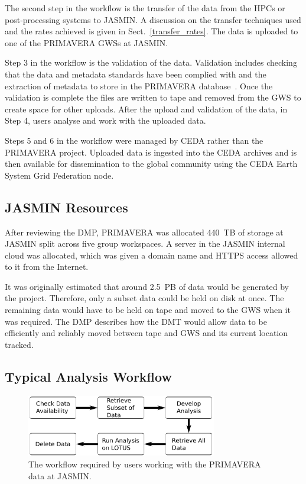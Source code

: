 \documentclass[gmd, manuscript]{copernicus}
\begin{document}
The second step in the workflow is the transfer of the data from the HPCs or post-processing systems to JASMIN. A discussion on the transfer techniques used and the rates achieved is given in Sect.~\ref{transfer_rates}. The data is uploaded to one of the PRIMAVERA GWSs at JASMIN.

Step 3 in the workflow is the validation of the data. Validation includes checking that the data and metadata standards have been complied with and the extraction of metadata to store in the PRIMAVERA database~\citep{Seddon2020}. Once the validation is complete the files are written to tape and removed from the GWS to create space for other uploads. After the upload and validation of the data, in Step 4, users analyse and work with the uploaded data. 

Steps 5 and 6 in the workflow were managed by CEDA rather than the PRIMAVERA project. Uploaded data is ingested into the CEDA archives and is then available for dissemination to the global community using the CEDA Earth System Grid Federation node.


\subsection{JASMIN Resources}

After reviewing the DMP, PRIMAVERA was allocated 440~TB of storage at JASMIN split across  five group workspaces. A server in the JASMIN internal cloud was allocated, which was given a domain name and  HTTPS access allowed to it from the Internet.

It was originally estimated that around 2.5~PB of data would be generated by the project. Therefore, only a subset data could be held on disk at once. The remaining data would have to be held on tape and moved to the GWS when it was required. The DMP describes how the DMT would allow data to be efficiently and reliably moved between tape and GWS and its current location tracked.

\subsection{Typical Analysis Workflow}

\begin{figure}[t]
	\includegraphics[width=8.3cm]{fig02.pdf}
	\caption{The workflow required by users working with the PRIMAVERA data at JASMIN.}
	\label{analysis_workflow}
\end{figure}
\end{document}
